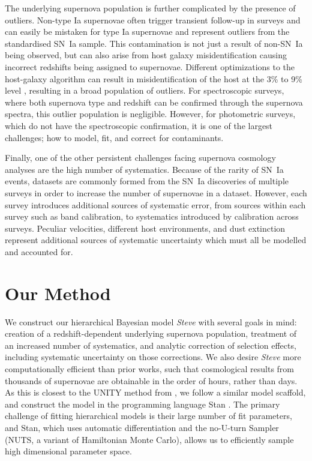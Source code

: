 \documentclass[twocolumn,trackchanges,tighten]{aastex62}
\newcommand{\steve}{\textit{Steve}}
\newcommand{\rubin}{\citetalias{Rubin2015}}
\begin{document}
The underlying supernova population is further complicated by the presence of outliers. Non-type Ia supernovae often trigger transient follow-up in surveys and can easily be mistaken for type Ia supernovae  and represent outliers from the standardised SN~Ia sample. This contamination is not just a result of non-SN~Ia being observed, but can also arise from host galaxy misidentification causing incorrect redshifts  being assigned to supernovae. Different optimizations to the host-galaxy algorithm can result in misidentification of the host at the 3\% to 9\% level \citep{Gupta2016}, resulting in a broad population of outliers. For spectroscopic surveys, where both supernova type and redshift can be confirmed through the supernova spectra, this outlier population is negligible. However, for photometric surveys, which do not have the spectroscopic confirmation, it is one of the largest challenges; how to model, fit, and correct for contaminants.

Finally, one of the other persistent challenges facing supernova cosmology analyses are the high number of systematics. Because of the rarity of SN~Ia events, datasets are commonly formed from the SN~Ia discoveries of multiple surveys in order to increase the number of supernovae in a dataset. However, each survey introduces additional sources of systematic error, from sources within each survey such as band calibration, to systematics introduced by calibration across surveys. Peculiar velocities, different host environments, and dust extinction represent additional sources of systematic uncertainty which must all be modelled and accounted for. 



\section{Our Method}
\label{sec:method}

We construct our hierarchical Bayesian model {\steve} with several goals in mind: creation of a redshift-dependent underlying supernova population,  treatment of an increased number of systematics, and analytic correction of selection effects, including systematic uncertainty on those corrections. We also desire {\steve} more computationally efficient than prior works, such that cosmological results from thousands of supernovae are obtainable in the order of hours, rather than days. As this is closest to the UNITY method from \citet[][hereafter denoted \rubin]{Rubin2015}, we follow a similar model scaffold, and construct the model in the programming language Stan \citep{Carpenter2017, StanDevelopmentTeam2017}. The primary challenge of fitting hierarchical models is their large number of fit parameters, and Stan, which uses automatic differentiation and the no-U-turn Sampler (NUTS, a variant of Hamiltonian Monte Carlo), allows us to efficiently sample high dimensional parameter space.
\end{document}
